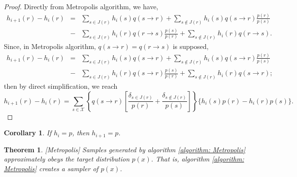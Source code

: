 \documentclass{article}
\newcommand{\nin}{\not\in}
\newtheorem{corollary}{Corollary}
\newtheorem{theorem}{Theorem}
\begin{document}
\begin{proof}
  Directly from Metropolis algorithm, we have,
  \begin{eqnarray*}
    h_{i+1} ( r ) -h_{i} ( r ) & = & \sum_{s \in J ( r )}  h_{i} ( s )  q ( s
    \rightarrow r ) + \sum_{s \nin J ( r )}  h_{i} ( s )  q ( s \rightarrow r
    )   \frac{p ( r )}{p ( s )}\\
    & - & \sum_{s \in J ( r )}  h_{i} ( r )  q ( r \rightarrow s )   \frac{p
    ( s )}{p ( r )} + \sum_{s \nin J ( r )}  h_{i} ( r )  q ( r \rightarrow s
    ) .
  \end{eqnarray*}
  Since, in Metropolis algorithm, $q ( s \rightarrow r ) =q ( r \rightarrow s
  )$ is supposed,
  \begin{eqnarray*}
    h_{i+1} ( r ) -h_{i} ( r ) & = & \sum_{s \in J ( r )}  h_{i} ( s )  q ( s
    \rightarrow r ) + \sum_{s \nin J ( r )}  h_{i} ( s )  q ( s \rightarrow r
    )   \frac{p ( r )}{p ( s )}\\
    & - & \sum_{s \in J ( r )}  h_{i} ( r )  q ( s \rightarrow r )   \frac{p
    ( s )}{p ( r )} + \sum_{s \nin J ( r )}  h_{i} ( r )  q ( s \rightarrow r
    ) ;
  \end{eqnarray*}
  then by direct simplification, we reach
  \[ h_{i+1} ( r ) -h_{i} ( r ) = \sum_{s \in \mathcal{X}} \left\{ q ( s
     \rightarrow r ) \left[   \frac{\delta_{s \in J ( r )}}{p ( r )} +
     \frac{\delta_{s \nin J ( r )}}{p ( s )} \right] \right\}   \{ h_{i} ( s )
     p ( r ) -h_{i} ( r )  p ( s ) \} . \]
\end{proof}

\begin{corollary}
  \label{corollary: Existence of Stable Distribution}If $h_{i} =p$, then
  $h_{i+1} =p$.
\end{corollary}

\begin{theorem}
  \label{theorem: Metropolis}[Metropolis] Samples generated by algorithm
  \ref{algorithm: Metropolis} approximately obeys the target distribution $p (
  x )$. That is, algorithm \ref{algorithm: Metropolis} creates a sampler of $p
  ( x )$.
\end{theorem}
\end{document}

